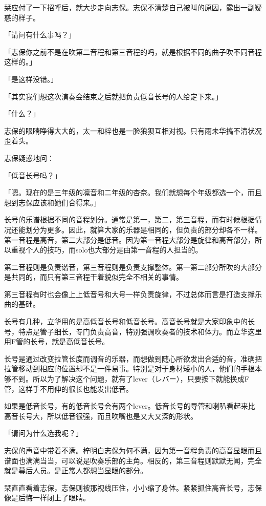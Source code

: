 \documentclass[UTF8]{ctexart}
\begin{document}
    栞应付了一下招呼后，就大步走向志保。志保不清楚自己被叫的原因，露出一副疑惑的样子。

    「请问有什么事吗？」

    「志保你之前不是在吹第二音程和第三音程的吗，就是根据不同的曲子吹不同音程这样的。」

    「是这样没错。」

    「其实我们想这次演奏会结束之后就把负责低音长号的人给定下来。」

    「什么？」

    志保的眼睛睁得大大的，太一和梓也是一脸狼狈互相对视。只有雨未华搞不清状况歪着头。

    志保疑惑地问：

    「低音长号吗？」

    「嗯。现在的是三年级的凛音和二年级的杏奈。我们就想每个年级都选一个，而且想到志保应该和她们合得来。」

    长号的乐谱根据不同的音程划分。通常是第一，第二，第三音程，而有时候根据情况还能划分为更多。因此，就算大家的乐器是相同的，但负责的部分却各不一样。第一音程是高音，第二大部分是低音。因为第一音程大部分是旋律和高音部分，所以重视个人的技巧，而solo也大部分是由第一音程的人担当的。

    第二音程则是负责谐音，第三音程则是负责支撑整体。第一第二部分所吹的大部分是共同的，而只有第三音程干着貌似完全不相关的事情。

    第三音程有时也会像上上低音号和大号一样负责旋律，不过总体而言是打造支撑乐曲的基础。

    长号有几种，立华用的是高低音长号和低音长号。高音长号就是大家印象中的长号，特点是管子细长，专门负责高音，特别强调吹奏者的技术和体力。而立华这里用F管的长号，就是高低音长号。

    长号是通过改变拉管长度而调音的乐器，而想做到随心所欲发出合适的音，准确把拉管移动到相应的位置却不是一件易事。特别是对于身材矮小的人，他们的手根本够不到。所以为了解决这个问题，就有了lever（レバー），只要按下就能换成F管，这样手不用伸的很长也能发出低音。

    如果是低音长号，有的低音长号会有两个lever。低音长号的导管和喇叭看起来比高音长号大，所以低音很强，而且吹嘴也是又大又深的形状。

    「请问为什么选我呢？」

    志保的声音中带着不满。梓明白志保为何不满，因为第一音程负责的高音显眼而且谱面也满满当当，可以说是吹奏乐部的主角。相反的，第三音程则默默无闻，完全就是幕后人员。是正常人都想当显眼的部分。

    栞直直看着志保，志保则被那视线压住，小小缩了身体。紧紧抓住高音长号，志保像是后悔一样闭上了眼睛。
\end{document}
